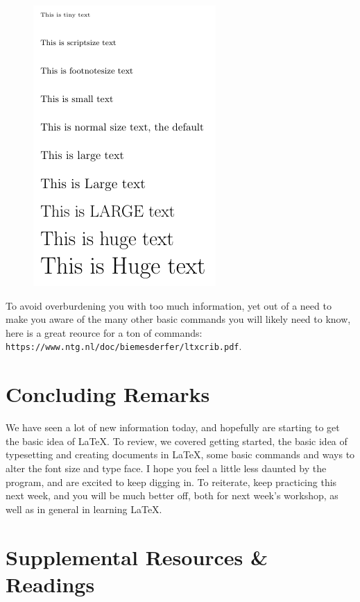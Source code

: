 \documentclass[11pt]{article}
\newcommand{\forceindent}{\leavevmode{\parindent=1.5em\indent}} %
\begin{document}
\begin{figure}[!h]
	\includegraphics[scale=.7]{OUT5} \\ %
	\centering
\end{figure}

	To avoid overburdening you with too much information, yet out of a need to make you aware of the many other basic commands you will likely need to know, here is a great reource for a ton of commands: \texttt{https://www.ntg.nl/doc/biemesderfer/ltxcrib.pdf}.

\newpage

\section{Concluding Remarks}

	\forceindent We have seen a lot of new information today, and hopefully are starting to get the basic idea of \LaTeX. To review, we covered getting started, the basic idea of typesetting and creating documents in \LaTeX, some basic commands and ways to alter the font size and type face. I hope you feel a little less daunted by the program, and are excited to keep digging in. To reiterate, keep practicing this next week, and you will be much better off, both for next week's workshop, as well as in general in learning \LaTeX. 

\newpage

\section{Supplemental Resources \& Readings}
\end{document}
